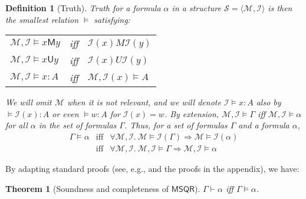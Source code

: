 \documentclass[times, 10pt]{article}
\newcommand{\MSQR}{\textsf{MSQR}}
\newcommand{\Un}{\textsf{U}}
\newcommand{\Me}{\textsf{M}}
\newtheorem{theorem}{Theorem}
\newtheorem{definition}{Definition}
\renewcommand{\Un}{\mathsf{U}}
\renewcommand{\Me}{\mathsf{M}}
\newcommand{\I}{\mathscr{I}}
\begin{document}
\begin{definition}[Truth]
  \emph{Truth} for a formula $\alpha$ in a structure 
  $\mathscr{S}=\langle\mathscr{M}, \I\rangle$
  is then the smallest relation $\vDash$ satisfying:
  \begin{center}
    \begin{tabular}{lll}
    $\mathscr{M},\I\vDash x\Me y$ & iff & 
    $\I(x) M \I(y)$ \\
    $\mathscr{M},\I\vDash x\Un y$ & iff & 
    $\I(x) U \I(y)$ \\
    $\mathscr{M},\I\vDash x:A$ & iff & 
    $\mathscr{M}, \I(x)\vDash A$
    \end{tabular}
  \end{center}
We will omit $\mathscr{M}$ when it is not relevant, and we will denote $\I \vDash x:A$ also by 
$\vDash \I(x):A$ or even $\vDash w:A$ for $\I(x)=w$.
By extension, $\mathscr{M},\I\vDash \Gamma$ iff 
$\mathscr{M},\I\vDash \alpha$ for all $\alpha$ in the set of formulas $\Gamma$. Thus, for 
a set of formulas $\Gamma$ and a formula $\alpha$,
\begin{displaymath}
\begin{array}{lll}
\Gamma \vDash \alpha & \mathrm{iff} & 
\forall \mathscr{M}, \I.\ \mathscr{M} \vDash \I(\Gamma) \Longrightarrow \mathscr{M} 
\vDash \I(\alpha) \\
& \mathrm{iff} & 
\forall \mathscr{M}, \I.\ \mathscr{M}, \I \vDash \Gamma \Longrightarrow \mathscr{M}, \I\vDash \alpha
\end{array}
\end{displaymath}
\end{definition}

By adapting standard proofs (see, e.g., \cite{Gabbay96,Prawitz65,Simpson93,TroelstraSchwichtenberg96,Vigano00a} and the proofs in the appendix), we have:

\begin{theorem}[Soundness and completeness of $\MSQR$]\label{theorem:soundness-completeness}
$\Gamma \vdash \alpha$ iff $\Gamma \vDash \alpha$.
\end{theorem}


\label{sec:partial}
\end{document}
